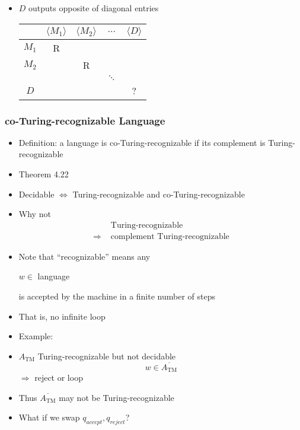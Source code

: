 \begin{frame}[allowframebreaks]
\begin{itemize}
\item $D$ outputs \alert{opposite of diagonal entries}
  \begin{center}
    \begin{tabular}{c|cccc}
& $\langle  M_1\rangle $ & $\langle  M_2\rangle $ & $\ldots$ & $\langle  D\rangle $\\ \hline
$M_1$ & R & &&\\
$M_2$ &  & R && \\
&& & $\ddots$ & \\
$D$ &&&& ?
    \end{tabular}
  \end{center}

\end{itemize}\end{frame} \begin{frame}[allowframebreaks] \frametitle{co-Turing-recognizable Language}
  \begin{itemize}
\item Definition: a language is co-Turing-recognizable
if its complement is Turing-recognizable
\item Theorem 4.22
\item[] Decidable $\Leftrightarrow$
Turing-recognizable and co-Turing-recognizable
\item Why not
  \begin{equation*}
    \begin{split}
&   \text{ Turing-recognizable} \\
\Rightarrow & \text{ complement Turing-recognizable}
\end{split}
\end{equation*}
\item Note that ``recognizable'' means any
  \begin{center}
  $w \in $ language
\end{center}
is accepted by the machine in \alert{a finite number of steps}
\item That is, no infinite loop
\item Example:
\item [] $A_{\text{TM}}$ Turing-recognizable but not decidable
  \begin{equation*}
    w \in \overline{A_{\text{TM}}}
  \end{equation*}
  $\Rightarrow$ reject or loop

  
\item [] Thus $\overline{A_{\text{TM}}}$ may not be Turing-recognizable

\item What if we swap $q_{accept},q_{reject}$?


\end{itemize}
\end{frame}
